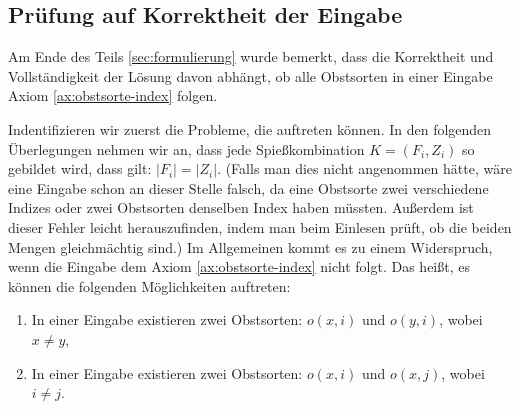\subsection{Prüfung auf Korrektheit der Eingabe}\label{sec:korrektheit-eingabe}
Am Ende des Teils \ref{sec:formulierung} wurde bemerkt, dass die Korrektheit und Vollständigkeit
der Lösung davon abhängt, ob alle Obstsorten in einer Eingabe Axiom \ref{ax:obstsorte-index} folgen.

Indentifizieren wir zuerst die Probleme, die auftreten können.
In den folgenden Überlegungen nehmen wir an, dass jede Spießkombination $K = (F_i, Z_i)$ so gebildet wird,
dass gilt: $|F_i| = |Z_i|$.
(Falls man dies nicht angenommen hätte, wäre eine Eingabe schon an dieser Stelle
falsch, da eine Obstsorte zwei verschiedene Indizes oder zwei Obstsorten denselben Index haben müssten.
Außerdem ist dieser Fehler leicht herauszufinden, indem man beim Einlesen prüft,
ob die beiden Mengen gleichmächtig sind.)
Im Allgemeinen kommt es zu einem Widerspruch, wenn die Eingabe
dem Axiom \ref{ax:obstsorte-index} nicht folgt. 
Das heißt, es können die folgenden 
Möglichkeiten auftreten:
\begin{enumerate}[label={(P\arabic*)}]
  \item In einer Eingabe existieren zwei Obstsorten: $o(x, i)$ und $o(y, i)$, wobei $x \neq y$,\label{probleme1}
  \item In einer Eingabe existieren zwei Obstsorten: $o(x, i)$ und $o(x, j)$, wobei $i \neq j$.\label{probleme2}
\end{enumerate}


